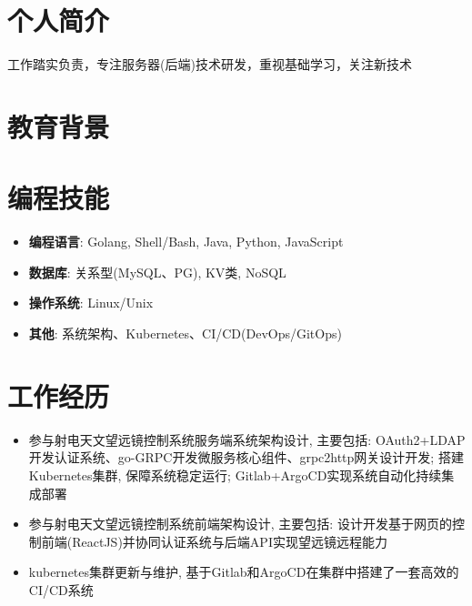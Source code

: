 \documentclass{resume}
\begin{document}


 
\section{个人简介}
工作踏实负责，专注服务器(后端)技术研发，重视基础学习，关注新技术
\section{教育背景}
\section{编程技能}
\begin{itemize}[parsep=0.2ex]
  \item \textbf{编程语言}: Golang, Shell/Bash, Java, Python, JavaScript
  \item \textbf{数据库}: 关系型(MySQL、PG), KV类, NoSQL
  \item \textbf{操作系统}: Linux/Unix
  \item \textbf{其他}: 系统架构、Kubernetes、CI/CD(DevOps/GitOps)
\end{itemize}


\section{工作经历}
\begin{itemize}
  \item 参与射电天文望远镜控制系统服务端系统架构设计, 主要包括: OAuth2+LDAP开发认证系统、go-GRPC开发微服务核心组件、grpc2http网关设计开发; 搭建Kubernetes集群, 保障系统稳定运行; Gitlab+ArgoCD实现系统自动化持续集成部署
  \item 参与射电天文望远镜控制系统前端架构设计, 主要包括: 设计开发基于网页的控制前端(ReactJS)并协同认证系统与后端API实现望远镜远程能力
  \item kubernetes集群更新与维护, 基于Gitlab和ArgoCD在集群中搭建了一套高效的CI/CD系统
\end{itemize}
\end{document}
